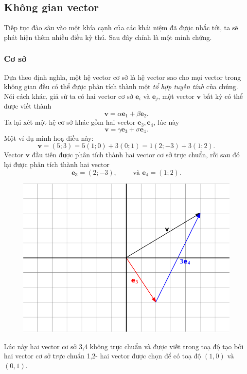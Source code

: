 \subsection{Không gian vector}
Tiếp tục đào sâu vào một khía cạnh của các khái niệm đã được nhắc tới, ta sẽ phát hiện thêm nhiều điều kỳ thú. Sau đây chính là một minh chứng.
\subsubsection*{Cơ sở\label{coso}}
Dựa theo định nghĩa, một hệ vector cơ sở là hệ vector sao cho mọi vector trong không gian đều có thể được phân tích thành một \emph{tổ hợp tuyến tính} của chúng. Nói cách khác, giả sử ta có hai vector cơ sở \(\mathbf{e}_i\) và \(\mathbf{e}_j\), một vector \(\mathbf{v}\) bất kỳ có thể được viết thành \[\mathbf{v}=\alpha\mathbf{e}_1 +\beta\mathbf{e}_2.\] Ta lại xét một hệ cơ sở khác gồm hai vector \(\mathbf{e}_{3}, \mathbf{e}_4\), lúc này \[\mathbf{v}=\gamma\mathbf{e}_3 +\sigma\mathbf{e}_4.\]
Một ví dụ  minh hoạ điều này:
\[\mathbf{v}= (5;3)=5(1;0)+3(0;1)=1(2;-3)
+3(1;2).\] Vector \(\mathbf{v}\) đầu tiên được phân tích thành hai vector cơ sở trực chuẩn, rồi sau đó lại được phân tích thành hai vector \[
\mathbf{e}_3 =(2;-3),\qquad \text{ và } \mathbf{e}_4 =(1;2).\] 
\begin{figure}[H]
    \centering
    \includegraphics[width=0.6\linewidth]{Tuan2/Figures/e3e4.png}
\end{figure}
Lúc này hai vector cơ sở 3,4 không trực chuẩn và được viết trong toạ độ tạo bởi hai vector cơ sở trực chuẩn 1,2- hai vector được chọn để có toạ độ \((1,0)\) và \((0,1)\).

